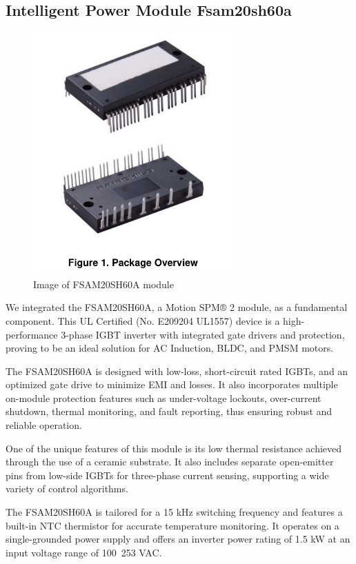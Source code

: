 \subsection{Intelligent Power Module Fsam20sh60a}

\begin{figure}[H]
	\centering
	\includegraphics[width=3in]{sections/section4/images/IPM/ipm.png}
	\caption{Image of FSAM20SH60A module}
\end{figure}


We integrated the FSAM20SH60A, a Motion SPM® 2 module, as a fundamental component. This UL Certified (No. E209204 UL1557) device is a high-performance 3-phase IGBT inverter with integrated gate drivers and protection, proving to be an ideal solution for AC Induction, BLDC, and PMSM motors.

The FSAM20SH60A is designed with low-loss, short-circuit rated IGBTs, and an optimized gate drive to minimize EMI and losses. It also incorporates multiple on-module protection features such as under-voltage lockouts, over-current shutdown, thermal monitoring, and fault reporting, thus ensuring robust and reliable operation. 

One of the unique features of this module is its low thermal resistance achieved through the use of a ceramic substrate. It also includes separate open-emitter pins from low-side IGBTs for three-phase current sensing, supporting a wide variety of control algorithms. 

The FSAM20SH60A is tailored for a 15 kHz switching frequency and features a built-in NTC thermistor for accurate temperature monitoring. It operates on a single-grounded power supply and offers an inverter power rating of 1.5 kW at an input voltage range of 100~253 VAC. 

